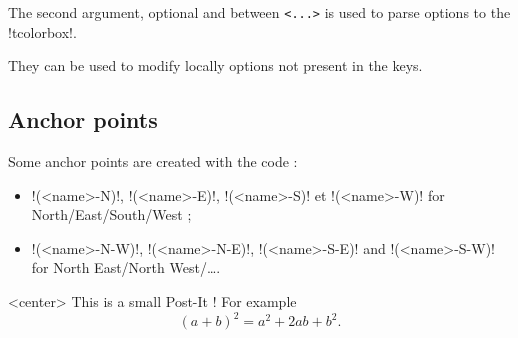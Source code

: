 \documentclass[english,a4paper,11pt]{article}
\begin{document}
\begin{tipblock}
The second argument, optional and between \texttt{<...>} is used to parse options to the \motcletex!tcolorbox!.

They can be used to modify locally options not present in the keys.
\end{tipblock}

\subsection{Anchor points}

\begin{tipblock}
Some anchor points are created with the code :

\begin{itemize}
	\item \motcletex!(<name>-N)!, \motcletex!(<name>-E)!, \motcletex!(<name>-S)! et \motcletex!(<name>-W)! for North/East/South/West ;
	\item \motcletex!(<name>-N-W)!, \motcletex!(<name>-N-E)!, \motcletex!(<name>-S-E)! and \motcletex!(<name>-S-W)! for North East/North West/\ldots.
\end{itemize}
\end{tipblock}

\begin{DemoCode}[]
\begin{center}
\begin{PostItNote}[Rotate=10,Pin=None,Render=tikz,StorePostIt=MySmallNote1]
	\lipsum[1][1-2]
\end{PostItNote}
\end{center}
\end{DemoCode}


\begin{DemoCode}[]
\begin{PostItNote}[StorePostIt=NoteY]<center>
	This is a small Post-It ! For example \[(a+b)^2=a^2+2ab+b^2.\]
\end{PostItNote}\\
\begin{PostItNote}[Render=tikz,Width=8cm,Color=blue,Rotate=-5,StorePostIt=NoteZ]
	\lipsum[1][1-2]
\end{PostItNote}

\end{DemoCode}
\end{document}
